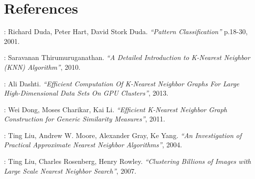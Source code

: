 \section{References}

\vspace{2 mm}
\noindent
[1]: Richard Duda, Peter Hart, David Stork Duda. \textit{``Pattern Classification''} p.18-30, 2001.

\vspace{2 mm}
\noindent
[2]: Saravanan Thirumuruganathan. \textit{``A Detailed Introduction to K-Nearest Neighbor (KNN) Algorithm''}, 2010. 

\vspace{2 mm}
\noindent
[3]: Ali Dashti. \textit{``Efficient Computation Of K-Nearest Neighbor Graphs For Large High-Dimensional Data Sets On GPU Clusters''}, 2013.

\vspace{2 mm}
\noindent
[4]: Wei Dong, Moses Charikar, Kai Li. \textit{``Efﬁcient K-Nearest Neighbor Graph Construction for Generic Similarity Measures''}, 2011.

\vspace{2 mm}
\noindent
[5]: Ting Liu, Andrew W. Moore, Alexander Gray, Ke Yang. \textit{``An Investigation of Practical Approximate Nearest Neighbor Algorithms''}, 2004.

\vspace{2 mm}
\noindent
[6]: Ting Liu, Charles Rosenberg, Henry Rowley. \textit{``Clustering Billions of Images with Large Scale Nearest Neighbor Search''}, 2007.
